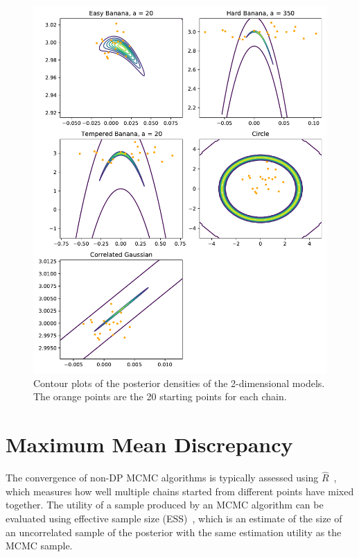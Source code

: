 \documentclass[english,twoside,openright]{HYgraduMLDS}
\begin{document}
\begin{figure}[h]
  \centering
  \includegraphics[width=\textwidth]{figures/posterior_plots}
  \caption{
    Contour plots of the posterior densities of the 2-dimensional models.
    The orange points are the 20 starting points for each chain.
  }
  \label{posterior_plots_fig}
\end{figure}



\section{Maximum Mean Discrepancy}\label{mmd_section}

The convergence of non-DP MCMC algorithms is typically assessed using 
\(\hat{R}\)~\cite{BDA}, which measures how well multiple chains started from 
different points have mixed together. The utility of a sample produced by an 
MCMC algorithm can be evaluated using effective sample size (ESS)~\cite{BDA},
which is an estimate of the size of an uncorrelated sample of the posterior
with the same estimation utility as the MCMC sample. 
\end{document}
